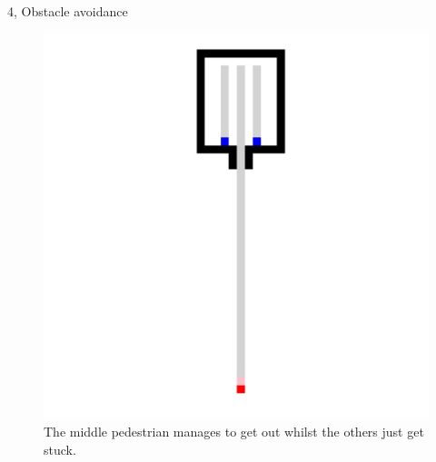 \documentclass[10pt,a4paper]{article}
\begin{document}
\begin{task}{4, Obstacle avoidance}
\begin{figure}[h!]
    \centering
    \includegraphics[width=\textwidth]{pictures/task4_cong_stuck.jpeg}
    \caption{The middle pedestrian manages to get out whilst the others just get stuck.}
    \label{fig:cong_stuck}
\end{figure}
\end{task}
\end{document}
